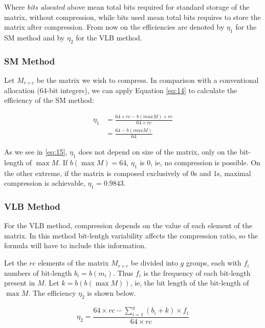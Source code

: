 \documentclass[10pt]{article}
\begin{document}
 Where \textit{bits alocated} above mean total bits required for standard 
storage of the matrix, without compression, while bits used mean total bits 
requires to store the matrix after compression. From now on the efficiencies are 
denoted by $\eta_1$ for the SM method and by $\eta_2$ for the VLB method.
 
\subsubsection*{SM Method}

Let $M_{r \times c}$ be the matrix we wish to compress. In comparison with a 
conventional allocation (64-bit integers), we can apply Equation \ref{eq:14} to 
calculate the efficiency of the SM method:

\begin{align}\label{eq:15}
 \eta_1 &= \frac{64 \times rc - b(max M) \times rc}{64 \times rc}\nonumber\\
 &= \frac{64  - b(max M) }{64}
\end{align}

As we see in \ref{eq:15}, $\eta_1$ does not depend on size of the matrix, only 
on the bit-length of $\max M$. If $b(\max M)=64$, $\eta_1$ is 0, ie, no 
compression is possible. On the other extreme, if the matrix is composed 
exclusively of 0s and 1s, maximal compression is achievable, 
$\eta_1=0.9843$.
 
\subsubsection*{VLB Method}
 
For the VLB method, compression depends on the value of each element of the 
matrix. In this method bit-lentgh variability affects the compression ratio, so 
the formula will have to include this information.

Let the $rc$ elements of the matrix $M_{r \times c}$ be divided into $g$ groups, 
each with $f_i$ numbers of bit-length $b_i = b(m_i)$. Thus $f_i$ is the 
frequency of each bit-length present in $M$. Let $k = b(b(\max M))$, ie, the 
bit length of the bit-length of $\max M$. The efficiency $\eta_2$ is shown 
below.

\begin{equation}\label{eq:16}
 \eta_2 = \frac{64 \times rc - \sum_{i=1}^{g} ( b_i + k ) \times f_i }{64 \times rc} 
\end{equation}
\end{document}
